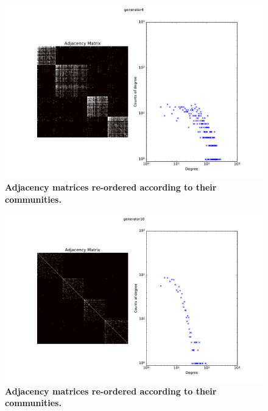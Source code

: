 \begin{figure}[h]
	\centering
	\includegraphics[scale=0.25]{img/Graph4}
	\caption{\textbf{Adjacency matrices re-ordered according to their communities.}}
	\label{fig:}
\end{figure}
\begin{figure}[h]
	\centering
	\includegraphics[scale=0.25]{img/Graph10}
	\caption{\textbf{Adjacency matrices re-ordered according to their communities.}}
	\label{fig:}
\end{figure}
%
%
%	
%
%


\clearpage



\clearpage

